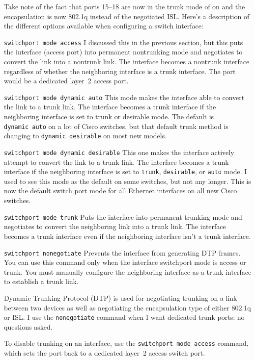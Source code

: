 Take note of the fact that ports 15--18 are now in the trunk mode of on
and the encapsulation is now 802.1q instead of the negotiated ISL.
Here's a description of the different options available when configuring
a switch interface:

\texttt{switchport\ mode\ access} I discussed this in the previous
section, but this puts the interface (access port) into permanent
nontrunking mode and negotiates to convert the link into a nontrunk
link. The interface becomes a nontrunk interface regardless of whether
the neighboring interface is a trunk interface. The port would be a
dedicated layer~2 access port.

\texttt{switchport\ mode\ dynamic\ auto} This mode makes the interface
able to convert the link to a trunk link. The interface becomes a trunk
interface if the neighboring interface is set to trunk or desirable
mode. The default is \texttt{dynamic\ auto} on a lot of Cisco switches,
but that default trunk method is changing to \texttt{dynamic\ desirable}
on most new models.

\texttt{switchport\ mode\ dynamic\ desirable} This one makes the
interface actively attempt to convert the link to a trunk link. The
interface becomes a trunk interface if the neighboring interface is set
to \texttt{trunk}, \texttt{desirable}, or \texttt{auto} mode. I used to
see this mode as the default on some switches, but not any longer. This
is now the default switch port mode for all Ethernet interfaces on all
new Cisco switches.

\texttt{switchport\ mode\ trunk} Puts the interface into permanent
trunking mode and negotiates to convert the neighboring link into a
trunk link. The interface becomes a trunk interface even if the
neighboring interface isn't a trunk interface.

\texttt{switchport\ nonegotiate} Prevents the interface from generating
DTP frames. You can use this command only when the interface switchport
mode is access or trunk. You must manually configure the neighboring
interface as a trunk interface to establish a trunk link.

\begin{note}
Dynamic Trunking Protocol (DTP) is used for negotiating trunking on a link between two devices as well as negotiating the encapsulation type of either 802.1q or ISL.
I use the \texttt{nonegotiate} command when I want dedicated trunk ports; no questions asked.
\end{note}

To disable trunking on an interface, use the \texttt{switchport\ mode\ access} command, which sets the port back to a dedicated layer~2 access switch port.




